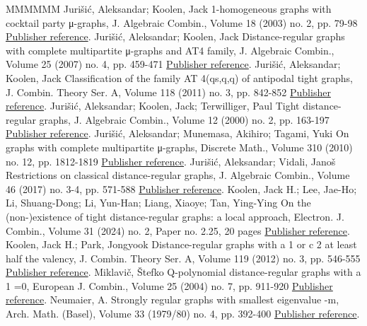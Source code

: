 \documentclass[11pt]{article}
\theoremstyle{definition}
\numberwithin{equation}{section}
\numberwithin{equation}{section}
\begin{document}
\begin{thebibliography}{MMMMMM}
 Jurišić, Aleksandar; Koolen, Jack 1-homogeneous graphs with cocktail party μ-graphs, J. Algebraic Combin., Volume 18 (2003) no. 2, pp. 79-98 \href{https://alco.centre-mersenne.org/articles/10.5802/alco.454/#JK2003}{Publisher reference}.
 Jurišić, Aleksandar; Koolen, Jack Distance-regular graphs with complete multipartite μ-graphs and AT4 family, J. Algebraic Combin., Volume 25 (2007) no. 4, pp. 459-471 \href{https://alco.centre-mersenne.org/articles/10.5802/alco.454/#JK2007}{Publisher reference}.
 Jurišić, Aleksandar; Koolen, Jack Classification of the family  AT 4(qs,q,q) of antipodal tight graphs, J. Combin. Theory Ser. A, Volume 118 (2011) no. 3, pp. 842-852 \href{https://alco.centre-mersenne.org/articles/10.5802/alco.454/#JK2011}{Publisher reference}.
 Jurišić, Aleksandar; Koolen, Jack; Terwilliger, Paul Tight distance-regular graphs, J. Algebraic Combin., Volume 12 (2000) no. 2, pp. 163-197 \href{https://alco.centre-mersenne.org/articles/10.5802/alco.454/#JKT2000}{Publisher reference}.
 Jurišić, Aleksandar; Munemasa, Akihiro; Tagami, Yuki On graphs with complete multipartite μ-graphs, Discrete Math., Volume 310 (2010) no. 12, pp. 1812-1819 \href{https://alco.centre-mersenne.org/articles/10.5802/alco.454/#JMT2010}{Publisher reference}.
 Jurišić, Aleksandar; Vidali, Janoš Restrictions on classical distance-regular graphs, J. Algebraic Combin., Volume 46 (2017) no. 3-4, pp. 571-588 \href{https://alco.centre-mersenne.org/articles/10.5802/alco.454/#JV2017}{Publisher reference}.
 Koolen, Jack H.; Lee, Jae-Ho; Li, Shuang-Dong; Li, Yun-Han; Liang, Xiaoye; Tan, Ying-Ying On the (non-)existence of tight distance-regular graphs: a local approach, Electron. J. Combin., Volume 31 (2024) no. 2, Paper no. 2.25, 20 pages \href{https://alco.centre-mersenne.org/articles/10.5802/alco.454/#KLLLLT2023+}{Publisher reference}.
 Koolen, Jack H.; Park, Jongyook Distance-regular graphs with a 1  or c 2  at least half the valency, J. Combin. Theory Ser. A, Volume 119 (2012) no. 3, pp. 546-555 \href{https://alco.centre-mersenne.org/articles/10.5802/alco.454/#KP2012}{Publisher reference}.
 Miklavič, Štefko Q-polynomial distance-regular graphs with a 1 =0, European J. Combin., Volume 25 (2004) no. 7, pp. 911-920 \href{https://alco.centre-mersenne.org/articles/10.5802/alco.454/#Miklavic2004}{Publisher reference}.
 Neumaier, A. Strongly regular graphs with smallest eigenvalue -m, Arch. Math. (Basel), Volume 33 (1979/80) no. 4, pp. 392-400 \href{https://alco.centre-mersenne.org/articles/10.5802/alco.454/#Neumaier.1979}{Publisher reference}.

\end{thebibliography}
\end{document}
